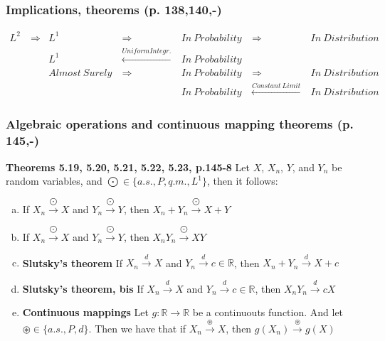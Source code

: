 \documentclass[]{article}
\begin{document}
\subsubsection{Implications, theorems (p. 138,140,-)}
$$
\begin{aligned}
	L^2~ &\Longrightarrow      &L^1  &\Longrightarrow& ~ In~Probability~ &\Longrightarrow&~ In~Distribution\\
	    &        &L^1  &\overset{Uniform Integr.}{\longleftarrow}&
			 ~ In~Probability~ & \\
	    & &Almost ~Surely ~ &\Longrightarrow& ~ In~Probability~ &\Longrightarrow&~In~Distribution\\
	    & & & & ~ In~Probability~ &\overset{Constant ~Limit}{\longleftarrow}&~In~Distribution~
	\end{aligned}
$$
\subsubsection{Algebraic operations and continuous mapping theorems (p. 145,-)}
\textbf{Theorems 5.19, 5.20, 5.21, 5.22, 5.23, p.145-8} Let $X$, $X_n$, $Y$, and $Y_n$ be random variables, and $\bigodot \in \{a.s., P, q.m., L^1\}$, then it follows:
\begin{enumerate}[a)]
	\item If $X_n \overset{\bigodot}{\longrightarrow} X$ and $Y_n \overset{\bigodot}{\longrightarrow} Y$, then $X_n + Y_n \overset{\bigodot}{\longrightarrow} X + Y$
	\item If $X_n \overset{\bigodot}{\longrightarrow} X$ and $Y_n \overset{\bigodot}{\longrightarrow} Y$, then $X_nY_n \overset{\bigodot}{\longrightarrow} X Y$
	\item \textbf{Slutsky's theorem} If $X_n \overset{d}{\longrightarrow} X$ and $Y_n \overset{d}{\longrightarrow} c \in \mathbb{R}$, then $X_n + Y_n \overset{d}{\longrightarrow} X + c$
	\item \textbf{Slutsky's theorem, bis} If $X_n \overset{d}{\longrightarrow} X$ and $Y_n \overset{d}{\longrightarrow} c \in \mathbb{R}$, then $X_n Y_n \overset{d}{\longrightarrow} cX$
	\item \textbf{Continuous mappings} Let $g: \mathbb{R} \rightarrow \mathbb{R}$ be a continuouts function. And let $\circledast \in \{a.s., P, d\}$. Then we have that if $X_n \overset{\circledast}{\longrightarrow} X$, then $g(X_n) \overset{\circledast}{\longrightarrow} g(X)$
\end{enumerate}
\clearpage

\end{document}
